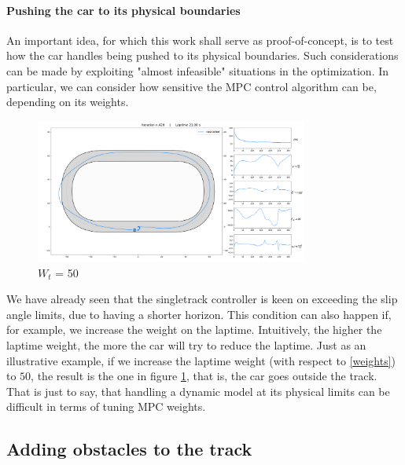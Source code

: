 \documentclass[a4paper, onecolumn, 12pt]{article}
\begin{document}
\paragraph{Pushing the car to its physical boundaries}
An important idea, for which this work shall serve as proof-of-concept, is to
test how the car handles being pushed to its physical boundaries. Such
considerations can be made by exploiting "almost infeasible" situations in the
optimization. In particular, we can consider how sensitive the MPC control
algorithm can be, depending on its weights.  
\begin{figure}[H]
    \centering
    \includegraphics[width=0.8\textwidth]{assets/cascaded_high_laptime_weight.png}
    \caption{$W_{t}$ = 50}
    \label{hightime}
\end{figure}
We have already seen that the singletrack controller is keen on exceeding the
slip angle limits, due to having a shorter horizon. This condition can also
happen if, for example, we increase the weight on the laptime. Intuitively, the
higher the laptime weight, the more the car will try to reduce the laptime. Just
as an illustrative example, if we increase the laptime weight (with respect to
\ref{weights}) to $50$, the result is the one in figure \ref{hightime}, that is,
the car goes outside the track. That is just to say, that handling a dynamic
model at its physical limits can be difficult in terms of tuning MPC weights.

\subsection{Adding obstacles to the track}
\end{document}
